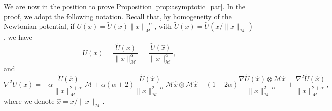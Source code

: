 \documentclass[a4paper,10pt]{amsart}
\theoremstyle{plain}
\theoremstyle{definition}
\numberwithin{equation}{section}
\numberwithin{thm}{section}
\begin{document}
\smallskip
We are now in the position to prove Proposition \ref{prop:asymptotic_par}. In the proof, we adopt the following notation.
Recall that, by homogeneity of the Newtonian potential, if $U(x)=\tilde U(x)\|x\|_{\mathcal M}^{-\alpha}$, with $\tilde U(x)=\tilde U(x/\|x\|_{\mathcal M})$, we have
\[
U(x) = \frac{\tilde U(x)}{\|x\|_{\mathcal M}^\alpha}=\frac{\tilde U(\hat x)}{\|x\|_{\mathcal M}^\alpha},
\]
and
\begin{equation}
\label{eq:hessian}{
\nabla^2 U(x) = - \alpha\frac{\tilde U(\hat x)}{\|x\|_{\mathcal M}^{2+\alpha}}\mathcal M+\alpha(\alpha+2)\frac{\tilde U(\hat x)}{\|x\|_{\mathcal M}^{2+\alpha}}\mathcal M\hat x\otimes \mathcal M\hat x - (1+2\alpha)\frac{\nabla\tilde U(\hat x)\otimes \mathcal M\hat x}{\|x\|_{\mathcal M}^{2+\alpha}}  +\frac{\nabla^2\tilde  U(\hat x)}{\|x\|_{\mathcal M}^{2+\alpha}},}
\end{equation}
where we denote $\hat x= x/\|x\|_{\mathcal M}$.
\end{document}
